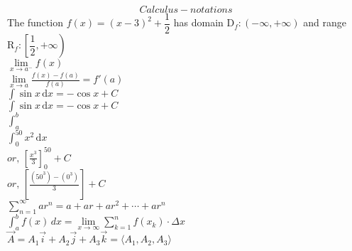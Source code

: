 \documentclass[12pt]{article}
\begin{document}
$$Calculus-notations$$
The function $f(x) = (x-3)^2 + \dfrac{1}{2}$ has domain $\mathrm{D}_f:(-\infty, +\infty)$
and range $\mathrm{R}_f: \left[\dfrac{1}{2}, +\infty\right)$\\[6pt]
$\lim\limits_{x\to a^-}f(x)$ \\[6pt]
$\displaystyle{\lim\limits_{x\to a}\frac{f(x) - f(a)}{f(a)} = f'(a)}$\\[6pt]
$\int \sin x\, \mathrm{d}x = -\cos x+ C$ \\[6pt]
$\displaystyle{\int \sin x\, \mathrm{d}x = -\cos x+ C}$ \\[6pt]
$\displaystyle{\int_a^b}$\\[6pt]
$\displaystyle{\int_{0}^{50}} x^2\,\mathrm{d}x$\\[6pt]
$or,\, \displaystyle{\left[\frac{x^3}{3}\right]_{0}^{50} + C}$\\[6pt]
$or,\, \displaystyle{\left[\frac{(50^3) - (0^3)}{3}\right]+ C}$ \\[6pt]
$\displaystyle{\sum\limits_{n=1}^{\infty}ar^n = a+ar+ar^2+ \cdots +ar^n}$ \\[6pt]

$\displaystyle{\int_a^b f(x)\,dx=\lim\limits_{x\to\infty} \sum\limits_{k=1}^n f(x_k)\cdot\Delta x}$\\[6pt]
$\vec{A} = A_1\vec{i}+A_2\vec{j}+A_3\vec{k} = \langle A_1, A_2, A_3\rangle$
\end{document}
